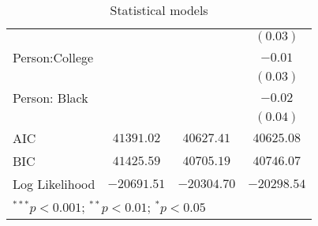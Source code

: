 \begin{table}
\begin{center}
\begin{tabular}{l c c c}
               &               &               & $(0.03)$      \\
Person:College &               &               & $-0.01$       \\
               &               &               & $(0.03)$      \\
Person: Black  &               &               & $-0.02$       \\
               &               &               & $(0.04)$      \\
\midrule
AIC            & $41391.02$    & $40627.41$    & $40625.08$    \\
BIC            & $41425.59$    & $40705.19$    & $40746.07$    \\
Log Likelihood & $-20691.51$   & $-20304.70$   & $-20298.54$   \\
\bottomrule
\multicolumn{4}{l}{\scriptsize{$^{***}p<0.001$; $^{**}p<0.01$; $^{*}p<0.05$}}
\end{tabular}
\caption{Statistical models}
\label{table:coefficients}
\end{center}
\end{table}
